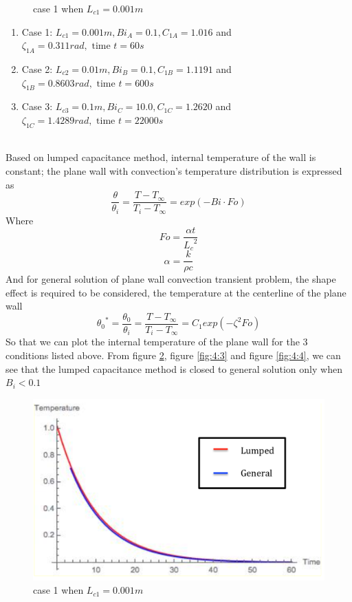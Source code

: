 \begin{example}
\begin{figure}[H]
    \caption{case 1 when $L_{c1}=0.001 m$}
    \label{fig:4:1}
\end{figure}
\begin{enumerate}
\item Case 1: $L_{c1}=0.001 m, Bi_A=0.1, C_{1A}=1.016$ and \\
$\zeta_{1A}=0.311 rad, \text{ time } t=60s$
\item Case 2: $L_{c2}=0.01 m, Bi_B=0.1, C_{1B}=1.1191$ and \\
$\zeta_{1B}=0.8603 rad, \text{ time } t=600s$
\item Case 3: $L_{c3}=0.1 m, Bi_C=10.0, C_{1C}=1.2620$ and \\
$\zeta_{1C}=1.4289 rad, \text{ time } t=22000s$
\end{enumerate}
\end{example}
\begin{solution}
~\\
Based on lumped capacitance method, internal temperature of the wall is constant; the plane wall with convection’s temperature distribution is expressed as
$$\frac{\theta}{\theta_i}=
\frac{T-T_\infty}{T_i-T_\infty}=exp(-Bi\cdot Fo)
$$
Where
$$Fo=\frac{\alpha t}{{L_c}^2}$$
$$\alpha=\frac{k}{\rho c}$$
And for general solution of plane wall convection transient problem, the shape effect is required to be considered, the temperature at the centerline of the plane wall
$${\theta_0}^*=\frac{\theta_0}{\theta_i}
=\frac{T-T_\infty}{T_i-T_\infty}=C_1 exp(-\zeta^2Fo)
$$
So that we can plot the internal temperature of the plane wall for the 3 conditions listed above. From figure \ref{fig:4:2}, figure \ref{fig:4:3} and figure \ref{fig:4:4}, we can see that the lumped capacitance method is closed to general solution only when $B_i<0.1$

\begin{figure}[H]
  \centering
    \includegraphics[scale=0.5]{figures/ch4/2}
    \caption{case 1 when $L_{c1}=0.001 m$}
    \label{fig:4:2}
\end{figure}


\end{solution}
